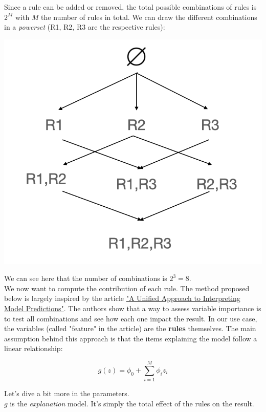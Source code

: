 Since a rule can be added or removed, the total possible combinations of rules is $2^M$ with $M$ the number of rules in total. We can draw the different combinations in a \textit{powerset} (R1, R2, R3 are the respective rules):

\begin{center}
\includegraphics[scale=0.6]{./../img/powerset.png}
\end{center}

We can see here that the number of combinations is $2^3 = 8$. \\

We now want to compute the contribution of each rule. The method proposed below is largely inspired by the article \href{https://arxiv.org/pdf/1705.07874.pdf}{"A Unified Approach to Interpreting Model Predictions"}. The authors show that a way to assess variable importance is to test all combinations and see how each one impact the result. In our use case, the variables (called "feature" in the article) are the \textbf{rules} themselves. The main assumption behind this approach is that the items explaining the model follow a linear relationship:

$$g(z) = \phi_0 + \sum_{i=1}^M \phi_i z_i$$

Let's dive a bit more in the parameters. \\

$g$ is the \textit{explanation} model. It's simply the total effect of the rules on the result.


